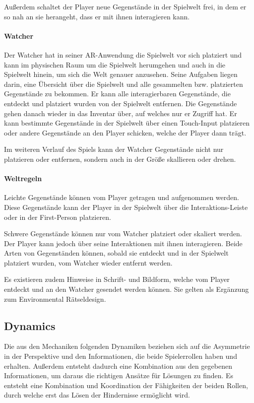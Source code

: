 Außerdem schaltet der Player neue Gegenstände in der Spielwelt frei, in dem er so nah an sie herangeht, dass er mit ihnen interagieren kann.

\paragraph{Watcher}
Der Watcher hat in seiner \ac{AR}-Anwendung die Spielwelt vor sich platziert und kann im physischen Raum um die Spielwelt herumgehen und auch in die Spielwelt hinein, um sich die Welt genauer anzusehen. Seine Aufgaben liegen darin, eine Übersicht über die Spielwelt und alle gesammelten bzw. platzierten Gegenstände zu bekommen. Er kann alle interagierbaren Gegenstände, die entdeckt und platziert wurden von der Spielwelt entfernen. Die Gegenstände gehen danach wieder in das Inventar über, auf welches nur er Zugriff hat. Er kann bestimmte Gegenstände in der Spielwelt über einen Touch-Input platzieren oder andere Gegenstände an den Player schicken, welche der Player dann trägt. 

Im weiteren Verlauf des Spiels kann der Watcher Gegenstände nicht nur platzieren oder entfernen, sondern auch in der Größe skallieren oder drehen.

\paragraph{Weltregeln}
Leichte Gegenstände können vom Player getragen und aufgenommen werden. Diese Gegenstände kann der Player in der Spielwelt über die Interaktions-Leiste oder in der First-Person platzieren. 

Schwere Gegenstände können nur vom Watcher platziert oder skaliert werden. Der Player kann jedoch über seine Interaktionen mit ihnen interagieren. Beide Arten von Gegenständen können, sobald sie entdeckt und in der Spielwelt platziert wurden, vom Watcher wieder entfernt werden.

Es existieren zudem Hinweise in Schrift- und Bildform, welche vom Player entdeckt und an den Watcher gesendet werden können. Sie gelten als Ergänzung zum Environmental Rätseldesign.

\subsection{Dynamics}
Die aus den Mechaniken folgenden Dynamiken beziehen sich auf die Asymmetrie in der Perspektive und den Informationen, die beide Spielerrollen haben und erhalten. Außerdem entsteht dadurch eine Kombination aus den gegebenen Informationen, um daraus die richtigen Ansätze für Lösungen zu finden. 
Es entsteht eine Kombination und Koordination der Fähigkeiten der beiden Rollen, durch welche erst das Lösen der Hindernisse ermöglicht wird.

